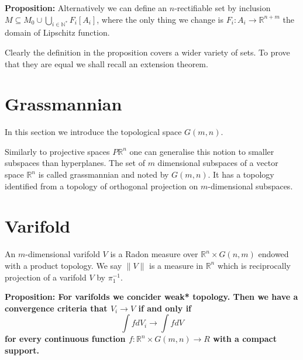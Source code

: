 \documentclass{article}
\begin{document}
\textbf{Proposition:} Alternatively we can define an $n$-rectifiable set by
inclusion $M\subseteq M_0\cup\bigcup_{i\in\mathbb{N}^*}F_i[A_i]$, where the only
thing we change is $F_i:A_i\rightarrow\mathbb{R}^{n+m}$ the domain of Lipschitz
function.

Clearly the definition in the proposition covers a wider variety of sets. To
prove that they are equal we shall recall an extension theorem.

\section{Grassmannian}

In this section we introduce the topological space $G(m,n)$.
\vspace{1ex}

Similarly to projective spaces $P\mathbb{R}^n$ one can generalise this notion to
smaller subspaces than hyperplanes. The set of $m$ dimensional subspaces of a
vector space $\mathbb{R}^n$ is called grassmannian and noted by $G(m,n)$. It
has a topology identified from a topology of orthogonal projection on
$m$-dimensional subspaces.

\section{Varifold}

An $m$-dimensional varifold $V$ is a Radon measure over $\mathbb{R}^n\times
G(n,m)$ endowed with a product topology. We say $\|V\|$ is a measure in
$\mathbb{R}^n$ which is reciprocally projection of a varifold $V$ by $\pi_1^{-1}$.

\textbf{Proposition: For varifolds we concider weak* topology. Then we have a
convergence criteria that $V_i\rightarrow V$ if and only if
\[\int fdV_i\rightarrow\int fdV\]
for every continuous function $f:\mathbb{R}^n\times G(m,n)\rightarrow R$ with a
compact support.}
\vspace{1ex}
\end{document}
